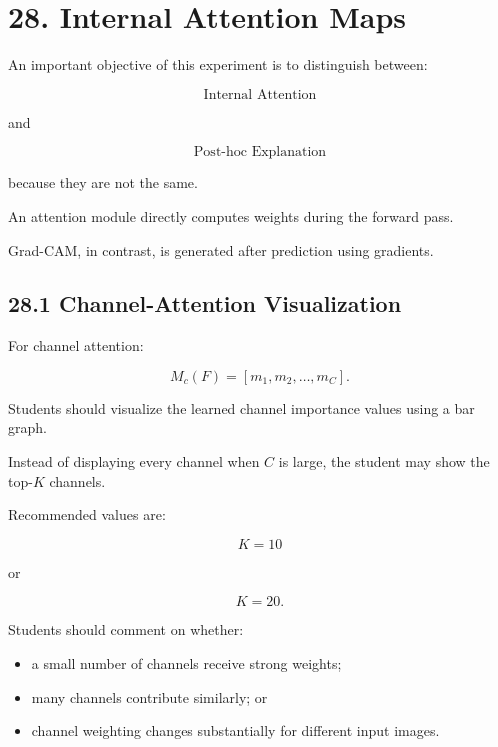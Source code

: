 \documentclass[10pt]{article}
\begin{document}
\section*{28. Internal Attention Maps}

An important objective of this experiment is to distinguish between:

\[
\boxed{\text{Internal Attention}}
\]

and

\[
\boxed{\text{Post-hoc Explanation}}
\]

because they are not the same.

An attention module directly computes weights during the forward pass.

Grad-CAM, in contrast, is generated after prediction using gradients.

\subsection*{28.1 Channel-Attention Visualization}

For channel attention:

\[
M_c(F)
=
[m_1,m_2,\ldots,m_C].
\]

Students should visualize the learned channel importance values using a bar
graph.

Instead of displaying every channel when $C$ is large, the student may show
the top-$K$ channels.

Recommended values are:

\[
K=10
\]

or

\[
K=20.
\]

Students should comment on whether:

\begin{itemize}

\item a small number of channels receive strong weights;

\item many channels contribute similarly; or

\item channel weighting changes substantially for different input images.

\end{itemize}
\end{document}
